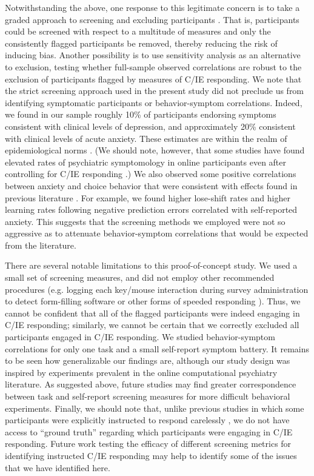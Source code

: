 \documentclass[a4paper,notitlepage,12pt]{article}
\begin{document}
\begin{refsection}[main]
Notwithstanding the above, one response to this legitimate concern is to take a graded approach to screening and excluding participants \cite{Kim2018-ev}. That is, participants could be screened with respect to a multitude of measures and only the consistently flagged participants be removed, thereby reducing the risk of inducing bias. Another possibility is to use sensitivity analysis as an alternative to exclusion, testing whether full-sample observed correlations are robust to the exclusion of participants flagged by measures of C/IE responding. We note that the strict screening approach used in the present study did not preclude us from identifying symptomatic participants or behavior-symptom correlations. Indeed, we found in our sample roughly 10\% of participants endorsing symptoms consistent with clinical levels of depression, and approximately 20\% consistent with clinical levels of acute anxiety. These estimates are within the realm of epidemiological norms \cite{kessler2012twelve, lowe2008validation, yarrington2021impact}. (We should note, however, that some studies have found elevated rates of psychiatric symptomology in online participants even after controlling for C/IE responding \cite{ophir2020turker}.) We also observed some positive correlations between anxiety and choice behavior that were consistent with effects found in previous literature \cite{huang2017computational, harle2017anhedonia, garrett2018updating}. For example, we found higher lose-shift rates and higher learning rates following negative prediction errors correlated with self-reported anxiety. This suggests that the screening methods we employed were not so aggressive as to attenuate behavior-symptom correlations that would be expected from the literature. 

There are several notable limitations to this proof-of-concept study. We used a small set of screening measures, and did not employ other recommended procedures (e.g. logging each key/mouse interaction during survey administration to detect form-filling software or other forms of speeded responding \cite{buchanan2018methods}). Thus, we cannot be confident that all of the flagged participants were indeed engaging in C/IE responding; similarly, we cannot be certain that we correctly excluded all participants engaged in C/IE responding. We studied behavior-symptom correlations for only one task and a small self-report symptom battery. It remains to be seen how generalizable our findings are, although our study design was inspired by experiments prevalent in the online computational psychiatry literature. As suggested above, future studies may find greater correspondence between task and self-report screening measures for more difficult behavioral experiments. Finally, we should note that, unlike previous studies in which some participants were explicitly instructed to respond carelessly \cite{buchanan2018methods}, we do not have access to ``ground truth'' regarding which participants were engaging in C/IE responding. Future work testing the efficacy of different screening metrics for identifying instructed C/IE responding may help to identify some of the issues that we have identified here.


\end{refsection}
\end{document}
